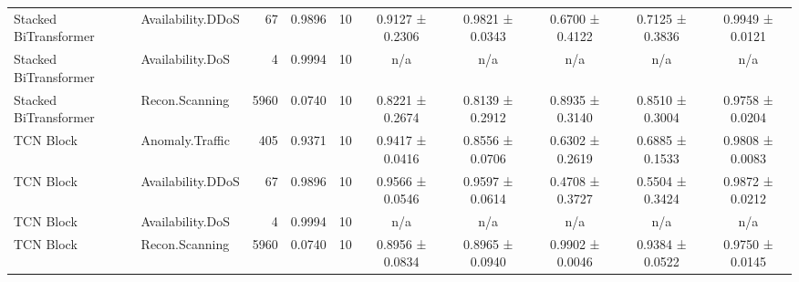 \begin{tabular}{llrrrccccc}
Stacked BiTransformer & Availability.DDoS & 67 & 0.9896 & 10 & 0.9127 ± 0.2306 & 0.9821 ± 0.0343 & 0.6700 ± 0.4122 & 0.7125 ± 0.3836 & 0.9949 ± 0.0121 \\
Stacked BiTransformer & Availability.DoS & 4 & 0.9994 & 10 & n/a & n/a & n/a & n/a & n/a \\
Stacked BiTransformer & Recon.Scanning & 5960 & 0.0740 & 10 & 0.8221 ± 0.2674 & 0.8139 ± 0.2912 & 0.8935 ± 0.3140 & 0.8510 ± 0.3004 & 0.9758 ± 0.0204 \\
TCN Block & Anomaly.Traffic & 405 & 0.9371 & 10 & 0.9417 ± 0.0416 & 0.8556 ± 0.0706 & 0.6302 ± 0.2619 & 0.6885 ± 0.1533 & 0.9808 ± 0.0083 \\
TCN Block & Availability.DDoS & 67 & 0.9896 & 10 & 0.9566 ± 0.0546 & 0.9597 ± 0.0614 & 0.4708 ± 0.3727 & 0.5504 ± 0.3424 & 0.9872 ± 0.0212 \\
TCN Block & Availability.DoS & 4 & 0.9994 & 10 & n/a & n/a & n/a & n/a & n/a \\
TCN Block & Recon.Scanning & 5960 & 0.0740 & 10 & 0.8956 ± 0.0834 & 0.8965 ± 0.0940 & 0.9902 ± 0.0046 & 0.9384 ± 0.0522 & 0.9750 ± 0.0145 \\
\bottomrule
\end{tabular}

